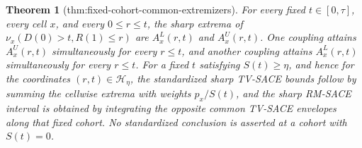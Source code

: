 \documentclass{article}
\newtheorem{theorem}{Theorem}
\begin{document}
\begin{theorem}[thm:fixed-cohort-common-extremizers]\label{thm:fixed-cohort-common-extremizers}
For every fixed \(t\in[0,\tau]\), every cell \(x\), and every \(0\leq r\leq t\), the sharp extrema of \(\nu_x(D(0)>t,R(1)\leq r)\) are \(A^L_x(r,t)\) and \(A^U_x(r,t)\).  One coupling attains \(A^U_x(r,t)\) simultaneously for every \(r\leq t\), and another coupling attains \(A^L_x(r,t)\) simultaneously for every \(r\leq t\).  For a fixed \(t\) satisfying \(S(t)\geq\eta\), and hence for the coordinates \((r,t)\in\mathcal H_\eta\), the standardized sharp TV-SACE bounds follow by summing the cellwise extrema with weights \(p_x/S(t)\), and the sharp RM-SACE interval is obtained by integrating the opposite common TV-SACE envelopes along that fixed cohort.  No standardized conclusion is asserted at a cohort with \(S(t)=0\).
\end{theorem}
\end{document}
